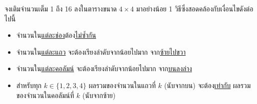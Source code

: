 \question{}

จงเติมจำนวนเต็ม 1 ถึง 16 ลงในตารางขนาด $\mathrm{4} \times \mathrm{4}$ 
มาอย่างน้อย 1 วิธีซึ่งสอดคล้องกับเงื่อนไขดังต่อไปนี้

\begin{itemize}
\item จำนวนใน\uline{แต่ละช่อง}ต้อง\uline{ไม่ซ้ำกัน}
\item จำนวนใน\uline{แต่ละแถว} จะต้องเรียงลำดับจากน้อยไปมาก จาก\uline{ซ้ายไปขวา}
\item จำนวนใน\uline{แต่ละคอลัมน์} จะต้องเรียงลำดับจากน้อยไปมาก จาก\uline{บนลงล่าง}
\item สำหรับทุก $k \in \{\mathrm{1, 2, 3, 4}\}$\; ผลรวมของจำนวนในแถวที่ $k$ (นับจากบน) จะต้อง\uline{เท่ากับ}
    ผลรวมของจำนวนในคอลัมน์ที่ $k$ (นับจากซ้าย)
\end{itemize}
